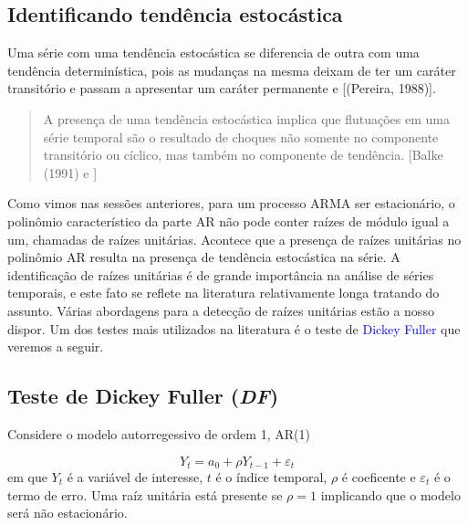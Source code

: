 \documentclass[
]{book}
\theoremstyle{definition}
\theoremstyle{definition}
\theoremstyle{definition}
\theoremstyle{remark}
\begin{document}
\hypertarget{identificando-tenduxeancia-estocuxe1stica}{%
\subsection{Identificando tendência estocástica}\label{identificando-tenduxeancia-estocuxe1stica}}

Uma série com uma tendência estocástica se diferencia de outra com uma tendência determinística, pois as mudanças na mesma deixam de ter um caráter transitório e passam a apresentar um caráter permanente \citep{gujarati2003} e {[}(Pereira, 1988){]}.

\begin{quote}
A presença de uma tendência estocástica implica que flutuações em uma série temporal são o resultado de choques não somente no
componente transitório ou cíclico, mas também no componente de tendência. {[}Balke (1991) e \citep{gujarati2003} {]}
\end{quote}

Como vimos nas sessões anteriores, para um processo ARMA ser estacionário, o polinômio característico da parte AR não pode conter raízes de módulo igual a um, chamadas de raízes unitárias. Acontece que a presença de raízes unitárias no polinômio AR resulta na presença de tendência estocástica na série. A identificação de raízes unitárias é de grande importância na análise de séries temporais, e este fato se reflete na literatura relativamente longa tratando do assunto. Várias abordagens para a detecção de raízes unitárias estão a nosso dispor. Um dos testes mais utilizados na literatura é o teste de \textcolor{blue}{ Dickey Fuller} que veremos a seguir.

\hypertarget{teste-de-dickey-fuller-df}{%
\subsection{\texorpdfstring{Teste de Dickey Fuller (\emph{DF})}{Teste de Dickey Fuller (DF)}}\label{teste-de-dickey-fuller-df}}

Considere o modelo autorregessivo de ordem 1, AR(1)

\begin{equation}
Y_{t}=a_0+\rho Y_{t-1}+\varepsilon_{t}
\label{eq:ar1}
\end{equation}
em que \(Y_t\) é a variável de interesse, \(t\) é o índice temporal, \(\rho\) é coeficente e \(\varepsilon_t\) é o termo de erro.
Uma raíz unitária está presente se \(\rho=1\) implicando que o modelo será não estacionário.
\end{document}
